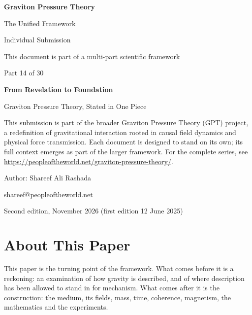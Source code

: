 \documentclass[11pt,a4paper]{article}
\begin{document}
\renewcommand{\thetable}{14.\arabic{table}}
\begin{titlepage}
\centering
\vspace*{1.5cm}
{\Huge\bfseries Graviton Pressure Theory\par}
\vspace{0.4cm}
{\Large The Unified Framework\par}
{\large Individual Submission\par}
\vspace{0.3cm}
{\normalsize This document is part of a multi-part scientific framework\par}
\vspace{1.6cm}
{\large Part 14 of 30\par}
\vspace{0.6cm}
{\huge\bfseries From Revelation to Foundation\par}
\vspace{0.5cm}
{\Large Graviton Pressure Theory, Stated in One Piece\par}
\vspace{1.4cm}
\begin{minipage}{0.82\textwidth}\centering\small
This submission is part of the broader Graviton Pressure Theory (GPT) project, a redefinition of gravitational interaction rooted in causal field dynamics and physical force transmission. Each document is designed to stand on its own; its full context emerges as part of the larger framework. For the complete series, see \url{https://peopleoftheworld.net/graviton-pressure-theory/}.
\end{minipage}
\vfill
{\large Author: Shareef Ali Rashada\par}
{\normalsize shareef@peopleoftheworld.net\par}
\vspace{0.3cm}
{\normalsize Second edition, November 2026 \quad (first edition 12 June 2025)\par}
\end{titlepage}

\tableofcontents
\newpage

\section*{About This Paper}

This paper is the turning point of the framework. What comes before it is a reckoning: an examination of how gravity is described, and of where description has been allowed to stand in for mechanism. What comes after it is the construction: the medium, its fields, mass, time, coherence, magnetism, the mathematics and the experiments.
\end{document}
